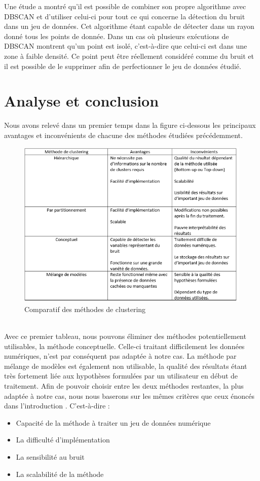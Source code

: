 \documentclass[memoire.tex]{subfiles}
\begin{document}
Une étude a montré qu’il est possible de combiner son propre algorithme avec DBSCAN et d’utiliser celui-ci pour tout ce qui concerne la détection du bruit dans un jeu de données. Cet algorithme étant capable de détecter dans un rayon donné tous les points de donnée. Dans un cas où plusieurs exécutions de DBSCAN montrent qu’un point est isolé, c’est-à-dire que celui-ci est dans une zone à faible densité. Ce point peut être réellement considéré comme du bruit et il est possible de le supprimer afin de perfectionner le jeu de données étudié.\cite{ref17}

\section{Analyse et conclusion}

Nous avons relevé dans un premier temps dans la figure ci-dessous les principaux avantages et inconvénients de chacune des méthodes étudiées précédemment.
	\begin{figure}[h!]
		\centerline{\includegraphics[scale=0.7]{img/comparatif_methodes.png}}
		\caption{Comparatif des méthodes de clustering}
	\end{figure}\\
Avec ce premier tableau, nous pouvons éliminer des méthodes potentiellement utilisables, la méthode conceptuelle. Celle-ci traitant difficilement les données numériques, n'est par conséquent pas adaptée à notre cas. La méthode par mélange de modèles est également non utilisable, la qualité des résultats étant très fortement liée aux hypothèses formulées par un utilisateur en début de traitement.
Afin de pouvoir choisir entre les deux méthodes restantes, la plus adaptée à notre cas, nous nous baserons sur les mêmes critères que ceux énoncés dans l'introduction . C'est-à-dire :\begin{itemize}
\item Capacité de la méthode à traiter un jeu de données numérique
\item La difficulté d'implémentation
\item La sensibilité au bruit
\item La scalabilité de la méthode
\end{itemize}
\end{document}
